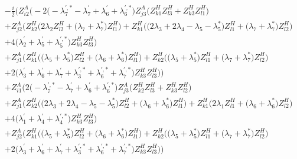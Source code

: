 \begin{align} 
 &-\frac{i}{2} \Big(Z_{{i 2}}^{A} \Big(-2 \Big(- \lambda^{{\prime},*}_7  - \lambda^{\prime}_7  + \lambda^{\prime}_6 + \lambda^{{\prime},*}_6\Big)Z_{{j 3}}^{A} \Big(Z_{{k 1}}^{H} Z_{{l 3}}^{H}  + Z_{{k 3}}^{H} Z_{{l 1}}^{H} \Big)\nonumber \\ 
 &+Z_{{j 2}}^{A} \Big(Z_{{k 2}}^{H} \Big(2 \lambda_2 Z_{{l 2}}^{H}  + \Big(\lambda_7 + \lambda_7^*\Big)Z_{{l 1}}^{H} \Big)+Z_{{k 1}}^{H} \Big(\Big(2 \lambda_3  + 2 \lambda_4  - \lambda_5  - \lambda_5^* \Big)Z_{{l 1}}^{H}  + \Big(\lambda_7 + \lambda_7^*\Big)Z_{{l 2}}^{H} \Big)\nonumber \\ 
 &+4 \Big(\lambda^{\prime}_2 + \lambda^{\prime}_5 + \lambda^{{\prime},*}_5\Big)Z_{{k 3}}^{H} Z_{{l 3}}^{H} \Big)\nonumber \\ 
 &+Z_{{j 1}}^{A} \Big(Z_{{k 1}}^{H} \Big(\Big(\lambda_5 + \lambda_5^*\Big)Z_{{l 2}}^{H}  + \Big(\lambda_6 + \lambda_6^*\Big)Z_{{l 1}}^{H} \Big)+Z_{{k 2}}^{H} \Big(\Big(\lambda_5 + \lambda_5^*\Big)Z_{{l 1}}^{H}  + \Big(\lambda_7 + \lambda_7^*\Big)Z_{{l 2}}^{H} \Big)\nonumber \\ 
 &+2 \Big(\lambda^{\prime}_3 + \lambda^{\prime}_6 + \lambda^{\prime}_7 + \lambda^{{\prime},*}_3 + \lambda^{{\prime},*}_6 + \lambda^{{\prime},*}_7\Big)Z_{{k 3}}^{H} Z_{{l 3}}^{H} \Big)\Big)\nonumber \\ 
 &+Z_{{i 1}}^{A} \Big(2 \Big(- \lambda^{{\prime},*}_7  - \lambda^{\prime}_7  + \lambda^{\prime}_6 + \lambda^{{\prime},*}_6\Big)Z_{{j 3}}^{A} \Big(Z_{{k 2}}^{H} Z_{{l 3}}^{H}  + Z_{{k 3}}^{H} Z_{{l 2}}^{H} \Big)\nonumber \\ 
 &+Z_{{j 1}}^{A} \Big(Z_{{k 2}}^{H} \Big(\Big(2 \lambda_3  + 2 \lambda_4  - \lambda_5  - \lambda_5^* \Big)Z_{{l 2}}^{H}  + \Big(\lambda_6 + \lambda_6^*\Big)Z_{{l 1}}^{H} \Big)+Z_{{k 1}}^{H} \Big(2 \lambda_1 Z_{{l 1}}^{H}  + \Big(\lambda_6 + \lambda_6^*\Big)Z_{{l 2}}^{H} \Big)\nonumber \\ 
 &+4 \Big(\lambda^{\prime}_1 + \lambda^{\prime}_4 + \lambda^{{\prime},*}_4\Big)Z_{{k 3}}^{H} Z_{{l 3}}^{H} \Big)\nonumber \\ 
 &+Z_{{j 2}}^{A} \Big(Z_{{k 1}}^{H} \Big(\Big(\lambda_5 + \lambda_5^*\Big)Z_{{l 2}}^{H}  + \Big(\lambda_6 + \lambda_6^*\Big)Z_{{l 1}}^{H} \Big)+Z_{{k 2}}^{H} \Big(\Big(\lambda_5 + \lambda_5^*\Big)Z_{{l 1}}^{H}  + \Big(\lambda_7 + \lambda_7^*\Big)Z_{{l 2}}^{H} \Big)\nonumber \\ 
 &+2 \Big(\lambda^{\prime}_3 + \lambda^{\prime}_6 + \lambda^{\prime}_7 + \lambda^{{\prime},*}_3 + \lambda^{{\prime},*}_6 + \lambda^{{\prime},*}_7\Big)Z_{{k 3}}^{H} Z_{{l 3}}^{H} \Big)\Big)\nonumber \\ 

\end{align}
